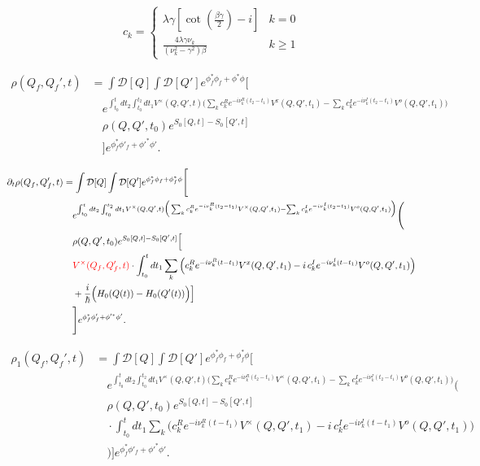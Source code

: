 \documentclass{article}
\begin{document}
\[
c_k = 
\begin{cases} 
\lambda \gamma \left[\cot\left(\frac{\beta \gamma}{2}\right) - i \right] & k = 0 \\
\frac{4 \lambda \gamma \nu_k}{\left(\nu_k^2 - \gamma^2\right) \beta} & k \geq 1
\end{cases}
\]

\begin{align*}
\rho(Q_f, Q_f', t) &= \int \mathcal{D}[Q] \int \mathcal{D}[Q'] 
e^{\phi_f^*\phi_f+\phi^*\phi}\Bigg[ \\
&\quad
e^{\int_{t_0}^t dt_2 \int_{t_0}^{t_2} dt_1 V^{\times}(Q, Q', t) \Big(
\sum_k c_k^R e^{-i \nu_k^R (t_2 - t_1)} V^x(Q, Q', t_1)
- \sum_k c_k^I e^{-i \nu_k^I (t_2 - t_1)} V^o(Q, Q', t_1) \Big)}  \\
&\quad 
\rho(Q, Q', t_0)e^{S_0[Q,t]-S_0[Q',t]}  \\
&\quad 
\Bigg] e^{\phi_f^*\phi'_f+\phi'^*\phi'} .
\end{align*}





\begin{align*}
\partial_t\rho(Q_f, Q_f', t) &= \int \mathcal{D}[Q] \int \mathcal{D}[Q'] 
e^{\phi_f^*\phi_f+\phi_f^*\phi}\Bigg[ \\
&\quad
 e^{\int_{t_0}^t dt_2 \int_{t_0}^{t_2} dt_1 V^{\times}(Q, Q', t) \Big(
\sum_k c_k^R e^{-i \nu_k^R (t_2 - t_1)} V^{\times}(Q, Q', t_1)
- \sum_k c_k^I e^{-i \nu_k^I (t_2 - t_1)} V^o(Q, Q', t_1) \Big)} \Bigg( \\
&\quad 
\rho(Q, Q', t_0)e^{S_0[Q,t]-S_0[Q',t]} \Big[ \\
&\quad \textcolor{red}{ 
 V^{\times}(Q_f, Q_f', t)} \cdot \int_{t_0}^t dt_1 \sum_k \Big(
c_k^R e^{-i \nu_k^R (t - t_1)} V^x(Q, Q', t_1)
- i \, c_k^I e^{-i \nu_k^I (t - t_1)} V^o(Q, Q', t_1) 
\Big) \\
&\quad 
+\frac{i}{\hbar} \Big(H_0(Q(t)) - H_0(Q'(t))\Big) \Big] \\
&\quad
\Bigg] e^{\phi_f^*\phi'_f+\phi'^*\phi'} .
\end{align*}


\begin{align*}
\rho_1(Q_f, Q_f', t) &= \int \mathcal{D}[Q] \int \mathcal{D}[Q'] 
e^{\phi_f^*\phi_f+\phi_f^*\phi}\Bigg[ \\
&\quad
e^{\int_{t_0}^t dt_2 \int_{t_0}^{t_2} dt_1 V^{\times}(Q, Q', t) \Big(
\sum_k c_k^R e^{-i \nu_k^R (t_2 - t_1)} V^{\times}(Q, Q', t_1)
- \sum_k c_k^I e^{-i \nu_k^I (t_2 - t_1)} V^o(Q, Q', t_1) \Big)} \Bigg( \\
&\quad 
\rho(Q, Q', t_0)e^{S_0[Q,t]-S_0[Q',t]}  \\
&\quad 
\cdot \int_{t_0}^t dt_1 \sum_k \Big(
c_k^R e^{-i \nu_k^R (t - t_1)} V^{\times}(Q, Q', t_1)
- i \, c_k^I e^{-i \nu_k^I (t - t_1)} V^o(Q, Q', t_1)
\Big) \\
&\quad
\Bigg) \Bigg] e^{\phi_f^*\phi'_f+\phi'^*\phi'} .
\end{align*}
\end{document}
